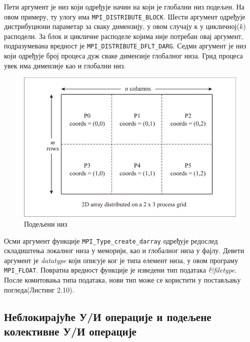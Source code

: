 Пети аргумент је низ који одређује начин на који је глобални низ подељен. На овом примеру, ту улогу има \texttt{MPI\_DISTRIBUTE\_BLOCK}.
Шести аргумент одређује дистрибуциони параметар за сваку димензију, у овом случају $к$ у цикличној($k$) расподели. За блок и цикличне расподеле
којима није потребан овај аргумент, подразумевана вредност је \texttt{MPI\_DISTRIBUTE\_DFLT\_DARG}. Седми аргумент је низ који одређује број процеса дуж сваке димензије глобалног низа. Грид процеса увек има димензије као и глобални низ. 

\begin{figure}[h!]
  \centering
      \includegraphics[width=1\textwidth]{slike/darray.png}
  \caption{Подељени низ}
\end{figure}

Осми аргумент функције \texttt{MPI\_Type\_create\_darray} одређује редослед складиштења локалног низа у меморији, као и глобалног низа у фајлу. Девети аргумент је \textit{datatype} који описује ког је типа елемент низа, у овом програму \texttt{MPI\_FLOAT}. Повратна вредност функције је изведени тип података \textit{\&filetype}. После комитовања типа података, нови тип може се користити у постављању погледа(Листинг 2.10). 


\subsection{Неблокирајуће У/И операције и подељене колективне У/И операције}

